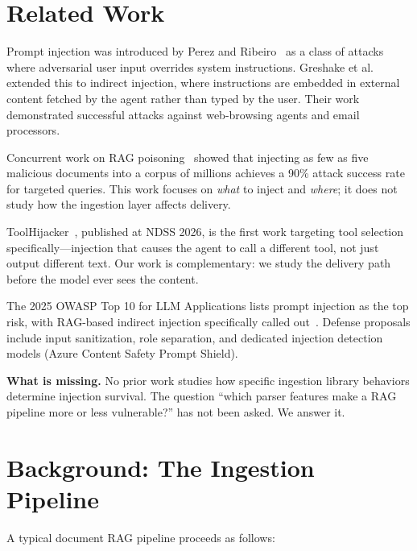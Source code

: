 \documentclass[conference,compsoc]{IEEEtran}
\begin{document}
\section{Related Work}

Prompt injection was introduced by Perez and Ribeiro~\cite{perez2022} as a
class of attacks where adversarial user input overrides system instructions.
Greshake et al.~\cite{greshake2023} extended this to indirect injection, where
instructions are embedded in external content fetched by the agent rather than
typed by the user. Their work demonstrated successful attacks against
web-browsing agents and email processors.

Concurrent work on RAG poisoning~\cite{zou2025poisonedrag} showed that
injecting as few as five malicious documents into a corpus of millions achieves
a 90\% attack success rate for targeted queries. This work focuses on
\emph{what} to inject and \emph{where}; it does not study how the ingestion
layer affects delivery.

ToolHijacker~\cite{shi2026toolhijacker}, published at NDSS 2026, is the first
work targeting tool selection specifically---injection that causes the agent to
call a different tool, not just output different text. Our work is
complementary: we study the delivery path before the model ever sees the
content.

The 2025 OWASP Top 10 for LLM Applications lists prompt injection as the top
risk, with RAG-based indirect injection specifically called out~\cite{owasp2025}.
Defense proposals include input sanitization, role separation, and dedicated
injection detection models (Azure Content Safety Prompt Shield).

\smallskip
\noindent\textbf{What is missing.} No prior work studies how specific ingestion
library behaviors determine injection survival. The question ``which parser
features make a RAG pipeline more or less vulnerable?'' has not been asked. We
answer it.


\section{Background: The Ingestion Pipeline}

A typical document RAG pipeline proceeds as follows:
\end{document}

